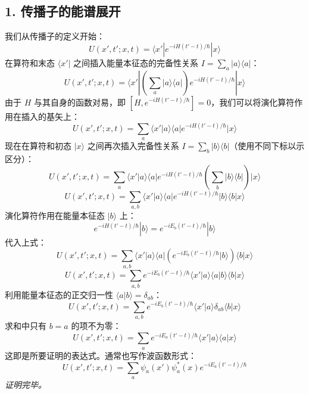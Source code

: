\documentclass[12pt, a4paper]{article}
\begin{document}
\subsection*{1. 传播子的能谱展开}
我们从传播子的定义开始：
\[ U(x', t'; x, t) = \langle x' | e^{-iH(t'-t)/\hbar} | x \rangle \]
在算符和末态 \(\langle x'|\) 之间插入能量本征态的完备性关系 \(I = \sum_a |a\rangle\langle a|\)：
\[ U(x', t'; x, t) = \langle x' | \left( \sum_a |a\rangle\langle a| \right) e^{-iH(t'-t)/\hbar} | x \rangle \]
由于 \(H\) 与其自身的函数对易，即 \([H, e^{-iH(t'-t)/\hbar}] = 0\)，我们可以将演化算符作用在插入的基矢上：
\[ U(x', t'; x, t) = \sum_a \langle x' | a\rangle\langle a| e^{-iH(t'-t)/\hbar} | x \rangle \]
现在在算符和初态 \(|x\rangle\) 之间再次插入完备性关系 \(I = \sum_b |b\rangle\langle b|\)（使用不同下标以示区分）：
\[ U(x', t'; x, t) = \sum_a \langle x' | a\rangle\langle a| e^{-iH(t'-t)/\hbar} \left( \sum_b |b\rangle\langle b| \right) | x \rangle \]
\[ U(x', t'; x, t) = \sum_{a, b} \langle x' | a\rangle\langle a| e^{-iH(t'-t)/\hbar} |b\rangle\langle b | x \rangle \]
演化算符作用在能量本征态 \(|b\rangle\) 上：
\[ e^{-iH(t'-t)/\hbar} |b\rangle = e^{-iE_b(t'-t)/\hbar} |b\rangle \]
代入上式：
\[ U(x', t'; x, t) = \sum_{a, b} \langle x' | a\rangle\langle a| \left( e^{-iE_b(t'-t)/\hbar} |b\rangle \right) \langle b | x \rangle \]
\[ U(x', t'; x, t) = \sum_{a, b} e^{-iE_b(t'-t)/\hbar} \langle x' | a\rangle\langle a|b\rangle\langle b | x \rangle \]
利用能量本征态的正交归一性 \(\langle a|b\rangle = \delta_{ab}\)：
\[ U(x', t'; x, t) = \sum_{a, b} e^{-iE_b(t'-t)/\hbar} \langle x' | a\rangle \delta_{ab} \langle b | x \rangle \]
求和中只有 \(b=a\) 的项不为零：
\[ U(x', t'; x, t) = \sum_a e^{-iE_a(t'-t)/\hbar} \langle x' | a\rangle \langle a | x \rangle \]
这即是所要证明的表达式。通常也写作波函数形式：
\[ U(x', t'; x, t) = \sum_a \psi_a(x') \psi_a^*(x) e^{-iE_a(t'-t)/\hbar} \]
\textit{证明完毕。}
\end{document}
